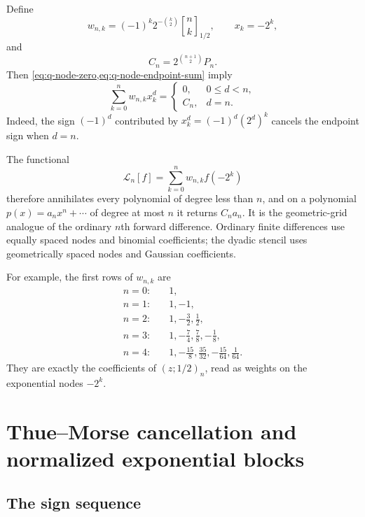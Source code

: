 \documentclass[11pt]{article}
\theoremstyle{definition}
\newcommand{\qpoch}[3]{\left(#1;#2\right)_{#3}}
\newcommand{\Qbin}[3]{\genfrac{[}{]}{0pt}{}{#1}{#2}_{#3}}
\begin{document}
Define
\begin{equation}
  w_{n,k}=(-1)^k2^{-\binom{k}{2}}\Qbin{n}{k}{1/2},
  \qquad
  x_k=-2^k,
  \label{eq:q-weights-nodes}
\end{equation}
and
\begin{equation}
  C_n=2^{\binom{n+1}{2}}P_n.
  \label{eq:Cn-definition}
\end{equation}
Then \cref{eq:q-node-zero,eq:q-node-endpoint-sum} imply
\begin{equation}
  \sum_{k=0}^{n}w_{n,k}x_k^d=
  \begin{cases}
    0,&0\le d<n,\\
    C_n,&d=n.
  \end{cases}
  \label{eq:q-weight-moments}
\end{equation}
Indeed, the sign $(-1)^d$ contributed by $x_k^d=(-1)^d(2^d)^k$ cancels the endpoint sign when $d=n$.

The functional
\begin{equation}
  \mathcal L_n[f]=\sum_{k=0}^{n}w_{n,k}f(-2^k)
  \label{eq:Ln-definition}
\end{equation}
therefore annihilates every polynomial of degree less than $n$, and on a polynomial $p(x)=a_nx^n+\cdots$ of degree at most $n$ it returns $C_na_n$.  It is the geometric-grid analogue of the ordinary $n$th forward difference.  Ordinary finite differences use equally spaced nodes and binomial coefficients; the dyadic stencil uses geometrically spaced nodes and Gaussian coefficients.

For example, the first rows of $w_{n,k}$ are
\begin{align*}
  n=0:&\quad 1,\\
  n=1:&\quad 1,-1,\\
  n=2:&\quad 1,-\frac32,\frac12,\\
  n=3:&\quad 1,-\frac74,\frac78,-\frac18,\\
  n=4:&\quad 1,-\frac{15}{8},\frac{35}{32},-\frac{15}{64},\frac1{64}.
\end{align*}
They are exactly the coefficients of $\qpoch{z}{1/2}{n}$, read as weights on the exponential nodes $-2^k$.

\section{Thue--Morse cancellation and normalized exponential blocks}
\label{sec:thue-morse}

\subsection{The sign sequence}
\end{document}
